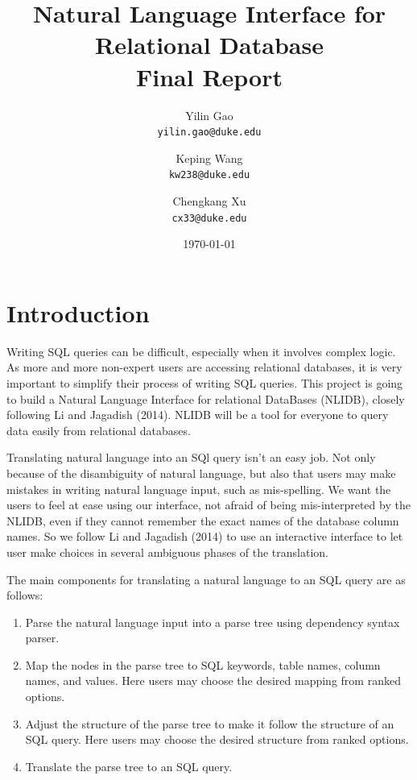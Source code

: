 \documentclass[twocolumn]{article}
\begin{document}
\title{Natural Language Interface for Relational Database\\	
	\small{Final Report}}

\author{Yilin Gao \\
	\small \texttt{yilin.gao@duke.edu} \and 
	Keping Wang \\
	\small \texttt{kw238@duke.edu} \and 
	Chengkang Xu \\
	\small \texttt{cx33@duke.edu} }
	
\date{\today}
\maketitle

\section{Introduction}\label{sec:introduction}

Writing SQL queries can be difficult, especially when it involves complex logic. As more and more non-expert users are accessing relational databases, it is very important to simplify their process of writing SQL queries. This project is going to build a Natural Language Interface for relational DataBases (NLIDB), closely following Li and Jagadish (2014)\cite{li2014}. NLIDB will be a tool for everyone to query data easily from relational databases.

Translating natural language into an SQl query isn't an easy job. Not only because of the disambiguity of natural language, but also that users may make mistakes in writing natural language input, such as mis-spelling. We want the users to feel at ease using our interface, not afraid of being mis-interpreted by the NLIDB, even if they cannot remember the exact names of the database column names. So we follow Li and Jagadish (2014)\cite{li2014} to use an interactive interface to let user make choices in several ambiguous phases of the translation.

The main components for translating a natural language to an SQL query are as follows:

\begin{enumerate}
  \item Parse the natural language input into a parse tree using dependency syntax parser.
  \item Map the nodes in the parse tree to SQL keywords, table names, column names, and values. Here users may choose the desired mapping from ranked options.
  \item Adjust the structure of the parse tree to make it follow the structure of an SQL query. Here users may choose the desired structure from ranked options.
  \item Translate the parse tree to an SQL query.
\end{enumerate}
\end{document}
